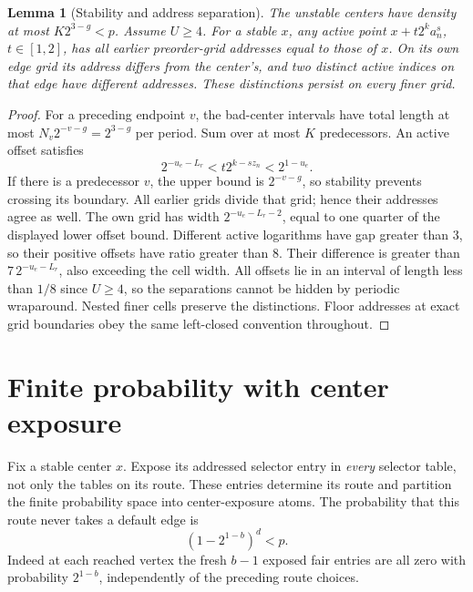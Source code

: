 \documentclass[11pt]{article}
\newtheorem{lemma}[theorem]{Lemma}
\theoremstyle{definition}
\theoremstyle{remark}
\begin{document}
\begin{lemma}[Stability and address separation]\label{lem:geometry}
The unstable centers have density at most $K2^{3-g}<p$. Assume $U\geq4$.
For a stable $x$, any active point
$x+t2^ka_n^s$, $t\in[1,2]$, has all earlier preorder-grid addresses equal to
those of $x$. On its own edge grid its address differs from the center's,
and two distinct active indices on that edge have different addresses.
These distinctions persist on every finer grid.
\end{lemma}
\begin{proof}
For a preceding endpoint $v$, the bad-center intervals have total length at
most $N_v2^{-v-g}=2^{3-g}$ per period. Sum over at most $K$ predecessors.
An active offset satisfies
\begin{equation}\label{eq:offsetbounds}
 2^{-u_e-L_r}<t2^{k-sz_n}<2^{1-u_e}.
\end{equation}
If there is a predecessor $v$, the upper bound is $2^{-v-g}$, so stability
prevents crossing its boundary. All earlier grids divide that grid; hence their
addresses agree as well. The own grid has width $2^{-u_e-L_r-2}$, equal to
one quarter of the displayed lower offset bound. Different active logarithms have gap
greater than $3$, so their positive offsets have ratio greater than $8$.
Their difference is greater than $7\,2^{-u_e-L_r}$, also exceeding the cell
width. All offsets lie in an interval of length less than $1/8$ since $U\geq4$,
so the separations cannot be hidden by periodic wraparound. Nested finer cells
preserve the distinctions. Floor addresses at exact grid boundaries obey the
same left-closed convention throughout.
\end{proof}

\section{Finite probability with center exposure}\label{sec:probability}
Fix a stable center $x$. Expose its addressed selector entry in \emph{every}
selector table, not only the tables on its route. These entries determine its
route and partition the finite probability space into center-exposure atoms.
The probability that this route never takes a default edge is
\begin{equation}\label{eq:nodefault}
 (1-2^{1-b})^d<p.
\end{equation}
Indeed at each reached vertex the fresh $b-1$ exposed fair entries are all zero
with probability $2^{1-b}$, independently of the preceding route choices.
\end{document}

